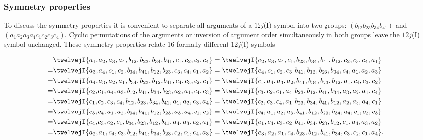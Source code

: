 \subsubsection{Symmetry properties}
To discuss the symmetry properties it is convenient to separate all arguments of a $12j$(I) symbol into two groups: $\left(b_{12} b_{23} b_{34} b_{41}\right)$ and $\left(a_{1} a_{2} a_{3} a_{4} c_{1} c_{2} c_{3} c_{4}\right)$. Cyclic permutations of the arguments or inversion of argument order simultaneously in both groups leave the $12j$(I) symbol unchanged. These
symmetry properties relate 16 formally different $12j$(I) symbols
\addtocounter{equation}{1}
\begin{align}
& \twelvejI{a_{1},a_{2},a_{3},a_{4},b_{12},b_{23},b_{34},b_{41},c_{1},c_{2},c_{3},c_{4}}=\twelvejI{a_{2},a_{3},a_{4},c_{1},b_{23},b_{34},b_{41},b_{12},c_{2},c_{3},c_{4},a_{1}}  \notag\\
= & \twelvejI{a_{3},a_{4},c_{1},c_{2},b_{34},b_{41},b_{12},b_{23},c_{3},c_{4},a_{1},a_{2}}=\twelvejI{a_{4},c_{1},c_{2},c_{3},b_{41},b_{12},b_{23},b_{34},c_{4},a_{1},a_{2},a_{3}}  \notag\\
= & \twelvejI{a_{4},a_{3},a_{2},a_{1},b_{34},b_{23},b_{12},b_{41},c_{4},c_{3},c_{2},c_{1}}=\twelvejI{c_{1},a_{4},a_{3},a_{2},b_{41},b_{34},b_{23},b_{12},a_{1},c_{4},c_{3},c_{2}}  \notag\\
= & \twelvejI{c_{2},c_{1},a_{4},a_{3},b_{12},b_{41},b_{34},b_{23},a_{2},a_{1},c_{4},c_{3}}=\twelvejI{c_{3},c_{2},c_{1},a_{4},b_{23},b_{12},b_{41},b_{34},a_{3},a_{2},a_{1},c_{4}}  \label{eq:10:13:9}\\
= & \twelvejI{c_{1},c_{2},c_{3},c_{4},b_{12},b_{23},b_{34},b_{41},a_{1},a_{2},a_{3},a_{4}}=\twelvejI{c_{2},c_{3},c_{4},a_{1},b_{23},b_{34},b_{41},b_{12},a_{2},a_{3},a_{4},c_{1}}  \notag\\
= & \twelvejI{c_{3},c_{4},a_{1},a_{2},b_{34},b_{41},b_{12},b_{23},a_{3},a_{4},c_{1},c_{2}}=\twelvejI{c_{4},a_{1},a_{2},a_{3},b_{41},b_{12},b_{23},b_{34},a_{4},c_{1},c_{2},c_{3}}  \notag\\
= & \twelvejI{c_{4},c_{3},c_{2},c_{1},b_{34},b_{23},b_{12},b_{41},a_{4},a_{3},a_{2},a_{1}}=\twelvejI{a_{1},c_{4},c_{3},c_{2},b_{41},b_{34},b_{23},b_{12},c_{1},a_{4},a_{3},a_{2}}  \notag\\
= & \twelvejI{a_{2},a_{1},c_{4},c_{3},b_{12},b_{41},b_{34},b_{23},c_{2},c_{1},a_{4},a_{3}}=\twelvejI{a_{3},a_{2},a_{1},c_{4},b_{23},b_{12},b_{41},b_{34},c_{3},c_{2},c_{1},a_{4}} . \notag
\end{align}


